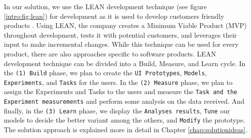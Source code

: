 In our solution, we use the LEAN development technique (see figure \ref{intro:fig:lean}) for development as it is used to develop customers friendly products \cite{article:lean:hart}.
Using LEAN, the company creates a Minimum Viable Product (MVP) throughout development, tests it with potential customers, and leverages their input to make incremental changes.
While this technique can be used for every product, there are also approaches specific to software products.
LEAN development technique can be divided into a Build, Measure, and Learn cycle. 
In the \texttt{(1) Build} phase, we plan to create the \texttt{UI Prototypes}, \texttt{Models}, \texttt{Experiments}, and \texttt{Tasks} for the users.
In the \texttt{(2) Measure} phase, we plan to assign the Experiments and Tasks to the users and measure the \texttt{Task and the Experiment measurements} and perform some analysis on the data received. 
And finally, in the \texttt{(3) Learn} phase, we display the \texttt{Analyses results}, \texttt{Tune} our models to decide the better variant among the others, and \texttt{Modify} the prototype. 
The solution approach is explained more in detail in Chapter \ref{chap:solutionideas}.